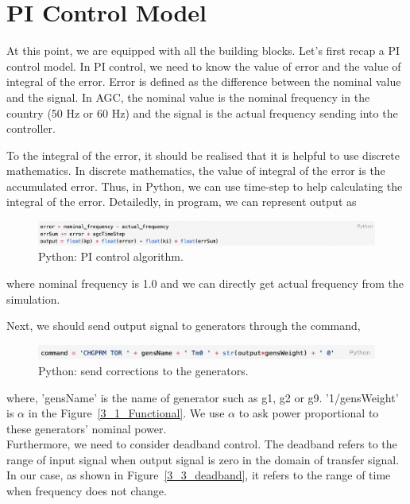 \section{PI Control Model} %
At this point, we are equipped with all the building blocks. Let's first recap a PI control model. In PI control, we need to know the value of error and the value of integral of the error. Error is defined as the difference between the nominal value and the signal. In AGC, the nominal value is the nominal frequency in the country (50 Hz or 60 Hz) and the signal is the actual frequency sending into the controller. 

To the integral of the error, it should be realised that it is helpful to use discrete mathematics. In discrete mathematics, the value of integral of the error is the accumulated error. Thus, in Python, we can use time-step to help calculating the integral of the error.  Detailedly, in program, we can represent output as 

\begin{figure}[!htbp]
\center
\includegraphics[scale=0.5]{figure/3_3_code1.png}
\caption{Python: PI control algorithm.}
\label{3_3_code1}
\end{figure}

where nominal frequency is 1.0 and we can directly get actual frequency from the simulation. 

Next, we should send output signal to generators through the command, 

\begin{figure}[!htbp]
\center
\includegraphics[scale=0.65]{figure/3_3_code2.png}
\caption{Python: send corrections to the generators.}
\label{3_3_code2}
\end{figure}

where, 'gensName' is the name of generator such as g1, g2 or g9. '1/gensWeight' is $\alpha$ in the Figure~\ref{3_1_Functional}. We use $\alpha$ to ask power proportional to these generators' nominal power.\\

Furthermore, we need to consider deadband control. The deadband refers to the range of input signal when output signal is zero in the domain of transfer signal. In our case, as shown in Figure~\ref{3_3_deadband}, it refers to the range of time when frequency does not change.  

